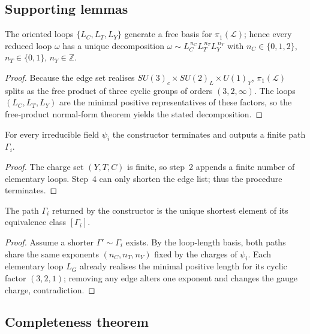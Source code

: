\subsection*{Supporting lemmas}

\begin{lemma}
The oriented loops
$\{L_C,L_T,L_Y\}$ generate a free basis for
$\pi_1(\mathscr L)$; hence every reduced loop
$\omega$ has a unique decomposition
$\omega\sim L_C^{\,n_C}L_T^{\,n_T}L_Y^{\,n_Y}$ with
$n_C\in\{0,1,2\}$, $n_T\in\{0,1\}$, $n_Y\in\mathbb Z$.
\end{lemma}

\begin{proof}
Because the edge set realises
$SU(3)_c\times SU(2)_L\times U(1)_Y$,
$\pi_1(\mathscr L)$ splits as the free product of three
cyclic groups of orders $(3,2,\infty)$.
The loops $(L_C,L_T,L_Y)$ are the minimal positive
representatives of these factors, so the free‑product
normal‑form theorem yields the stated decomposition.
\end{proof}

\begin{lemma}[Existence]
For every irreducible field $\psi_i$ the constructor
terminates and outputs a finite path $\Gamma_i$.
\end{lemma}

\begin{proof}
The charge set $(Y,T,C)$ is finite, so step 2 appends a
finite number of elementary loops.  Step 4 can only
shorten the edge list; thus the procedure terminates.
\end{proof}

\begin{lemma}[Minimality]
The path $\Gamma_i$ returned by the constructor is the
unique shortest element of its equivalence class
$[\Gamma_i]$.
\end{lemma}

\begin{proof}
Assume a shorter $\Gamma'\sim\Gamma_i$ exists.
By the loop‑length basis, both paths share the same
exponents $(n_C,n_T,n_Y)$ fixed by the charges of
$\psi_i$.  Each elementary loop $L_G$ already realises
the minimal positive length for its cyclic factor
$(3,2,1)$; removing any edge alters one exponent and
changes the gauge charge, contradiction.
\end{proof}

\subsection*{Completeness theorem}

